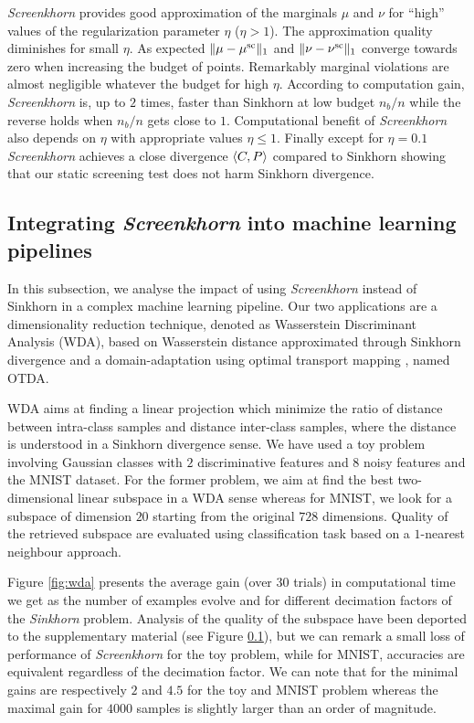 %
\emph{Screenkhorn} provides good approximation of the marginals $\mu$ and $\nu$ for ``high'' values of the regularization parameter $\eta$ ($\eta > 1$). The approximation quality diminishes for small $\eta$. As expected $\|{\mu} -{\mu}^{\text{sc}}\|_1$ and $\|{\nu} -{\nu}^{\text{sc}}\|_1$ converge towards zero when increasing the budget of points. Remarkably marginal violations are almost negligible whatever the budget for high $\eta$.  According to computation gain, \emph{Screenkhorn} is, up to $2$ times, faster than Sinkhorn at low budget $n_b/n$ while the reverse holds when $n_b/n$ gets close to $1$.  Computational benefit of \emph{Screenkhorn} also depends on $\eta$ with appropriate values $\eta \leq 1$. Finally except for $\eta=0.1$ \emph{Screenkhorn} achieves a close divergence $\langle C, P \rangle$ compared to Sinkhorn showing that our static screening test does not harm Sinkhorn divergence.  

\subsection{Integrating \emph{Screenkhorn} into machine learning pipelines}

In this subsection, we analyse the impact of using \emph{Screenkhorn}
instead of Sinkhorn in a complex machine learning pipeline. Our two applications
are a dimensionality reduction technique, denoted as Wasserstein Discriminant Analysis (WDA), based on Wasserstein distance approximated
through Sinkhorn divergence \citep{flamary2018WDA} and a domain-adaptation using optimal transport mapping \citep{courty2017optimal}, named OTDA. 

WDA aims at finding a linear projection which minimize the ratio of distance between intra-class samples and distance inter-class samples, where the distance is understood
in a Sinkhorn divergence sense. We have used a toy problem involving Gaussian classes with $2$ discriminative features and $8$ noisy features and the MNIST dataset. For the
former problem, we aim at find the best two-dimensional linear subspace in a WDA sense whereas for MNIST, we look for a subspace of dimension $20$ starting from the original
$728$ dimensions.  Quality of the retrieved subspace are evaluated using classification task based on a $1$-nearest neighbour approach.

Figure \ref{fig:wda} presents the average gain (over $30$ trials) in computational time we get as the number of examples evolve and for different decimation factors of the \emph{Sinkhorn} problem.
Analysis of the quality of the subspace have been deported to the supplementary material (see Figure \ref{}), but we can remark a small loss of performance of \emph{Screenkhorn} for the toy problem, while
for MNIST, accuracies are equivalent regardless of the decimation factor.  We can note
that for the minimal gains are respectively $2$ and $4.5$ for the toy and MNIST problem
whereas the maximal gain for $4000$ samples is slightly larger than an order of magnitude. 

